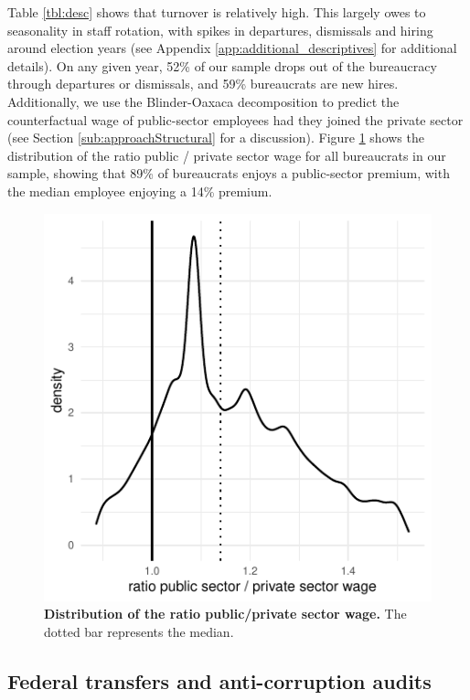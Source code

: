 \documentclass[12pt,a4paper]{article}
\theoremstyle{definition}
\begin{document}
Table \ref{tbl:desc} shows that turnover is relatively high. This largely owes to seasonality in staff rotation, with spikes in departures, dismissals and hiring around election years (see Appendix \ref{app:additional_descriptives} for additional details). On any given year, 52\% of our sample drops out of the bureaucracy through departures or dismissals, and 59\% bureaucrats are new hires. Additionally, we use the Blinder-Oaxaca decomposition \citep{blinder1973wage} to predict the counterfactual wage of public-sector employees had they joined the private sector (see Section \ref{sub:approachStructural} for a discussion). Figure \ref{fig:panel_summary} shows the distribution of the ratio public / private sector wage for all bureaucrats in our sample, showing that 89\% of bureaucrats enjoys a public-sector premium, with the median employee enjoying a 14\% premium. 

\begin{figure}[H]
    \centering
    \includegraphics{figures/sampleDistribwwb.pdf}
    \caption{{\bf Distribution of the ratio public/private sector wage.} The dotted bar represents the median.}
    \label{fig:panel_summary}
\end{figure}


\subsection{Federal transfers and anti-corruption audits}
\label{sub:audits}
\end{document}
